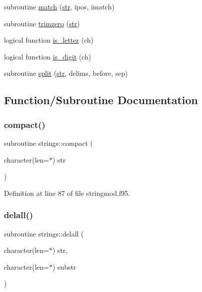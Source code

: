 \begin{DoxyCompactItemize}
subroutine \hyperlink{namespacestrings_ad5ead0bc741b619b8e30528ccebbd057}{match} (\hyperlink{_s_o_l_w_e_i_g__misc_8f95_a77a2ca74046c88062aa8333bf1eaca05}{str}, ipos, imatch)
\item 
subroutine \hyperlink{namespacestrings_a18777b9741e00afdfe3ec5f5fa16ca46}{trimzero} (\hyperlink{_s_o_l_w_e_i_g__misc_8f95_a77a2ca74046c88062aa8333bf1eaca05}{str})
\item 
logical function \hyperlink{namespacestrings_a3b44a9a233716da3271b645eee79d8f0}{is\+\_\+letter} (ch)
\item 
logical function \hyperlink{namespacestrings_a91d4d50cfe3e624152f5234d89aa6dc5}{is\+\_\+digit} (ch)
\item 
subroutine \hyperlink{namespacestrings_a12ec697adfa3201deadb7777456db11c}{split} (\hyperlink{_s_o_l_w_e_i_g__misc_8f95_a77a2ca74046c88062aa8333bf1eaca05}{str}, delims, before, sep)
\end{DoxyCompactItemize}


\subsection{Function/\+Subroutine Documentation}
\mbox{\label{namespacestrings_a31b0ac7636006c8c80397649219c6eaf}} 
\subsubsection{\texorpdfstring{compact()}{compact()}}
{\footnotesize\ttfamily subroutine strings\+::compact (\begin{DoxyParamCaption}\item[{character(len=$\ast$)}]{str }\end{DoxyParamCaption})}



Definition at line 87 of file stringmod.\+f95.

\mbox{\label{namespacestrings_a453a1e27838f7417c0ea98cb36ebd9d7}} 
\subsubsection{\texorpdfstring{delall()}{delall()}}
{\footnotesize\ttfamily subroutine strings\+::delall (\begin{DoxyParamCaption}\item[{character(len=$\ast$)}]{str,  }\item[{character(len=$\ast$)}]{substr }\end{DoxyParamCaption})}



